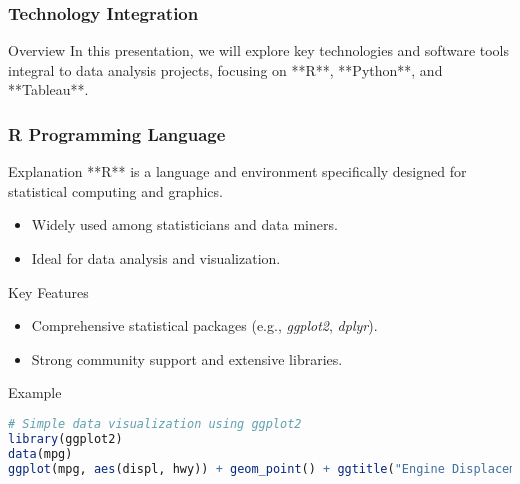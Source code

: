 \documentclass[aspectratio=169]{beamer}
\begin{document}
\begin{frame}
    \frametitle{Technology Integration}
    \begin{block}{Overview}
        In this presentation, we will explore key technologies and software tools integral to data analysis projects, focusing on **R**, **Python**, and **Tableau**.
    \end{block}
\end{frame}

\begin{frame}[fragile]
    \frametitle{R Programming Language}
    
    \begin{block}{Explanation}
        **R** is a language and environment specifically designed for statistical computing and graphics. 
        \begin{itemize}
            \item Widely used among statisticians and data miners.
            \item Ideal for data analysis and visualization.
        \end{itemize}
    \end{block}

    \begin{block}{Key Features}
        \begin{itemize}
            \item Comprehensive statistical packages (e.g., \emph{ggplot2}, \emph{dplyr}).
            \item Strong community support and extensive libraries.
        \end{itemize}
    \end{block}
    
    \begin{block}{Example}
        \begin{lstlisting}[language=R]
# Simple data visualization using ggplot2
library(ggplot2)
data(mpg)
ggplot(mpg, aes(displ, hwy)) + geom_point() + ggtitle("Engine Displacement vs. Highway MPG")
        \end{lstlisting}
    \end{block}
\end{frame}
\end{document}
